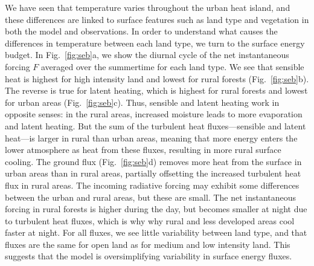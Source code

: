We have seen that temperature varies throughout the urban heat island, and these differences are linked to surface features such as land type and vegetation in both the model and observations. 
In order to understand what causes the differences in temperature between each land type, we turn to the surface energy budget. In Fig.~\ref{fig:seb}a, we show the diurnal cycle of the net instantaneous forcing $F$ averaged over the summertime for each land type. We see that sensible heat is highest for high intensity land and lowest for rural forests (Fig.~\ref{fig:seb}b). The reverse is true for latent heating, which is highest for rural forests and lowest for urban areas  (Fig.~\ref{fig:seb}c). Thus, sensible and latent heating work in opposite senses: in the rural areas, increased moisture leads to more evaporation and latent heating. But the sum of the turbulent heat fluxes---sensible and latent heat---is larger in rural than urban areas, meaning that more energy enters the lower atmosphere as heat from these fluxes, resulting in more rural surface cooling. The ground flux  (Fig.~\ref{fig:seb}d) removes more heat from the surface in urban areas than in rural areas, partially offsetting the increased turbulent heat flux in rural areas. The incoming radiative forcing may exhibit some differences between the urban and rural areas, but these are small. 
The net instantaneous forcing in rural forests is higher during the day, but becomes smaller at night due to turbulent heat fluxes, which is why why rural and less developed areas cool faster at night. 
For all fluxes, we see little variability between land type, and that fluxes are the same for open land as for medium and low intensity land. This suggests that the model is oversimplifying variability in surface energy fluxes.


